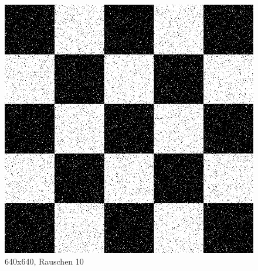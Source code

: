 \begin{figure}[hbt]
	\centering
	\includegraphics[width=0.7\linewidth]{./Bilder/Auswertung/BeispielBilder/Picture_Example1_noise_10_pixelCnt_128_featureCnt_5}
	\caption{640x640, Rauschen 10}
\end{figure}